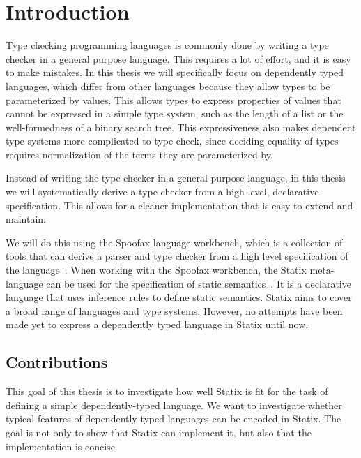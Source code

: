 \chapter{Introduction}

Type checking programming languages is commonly done by writing a type checker in a general purpose language. This requires a lot of effort, and it is easy to make mistakes. In this thesis we will specifically focus on dependently typed languages, which differ from other languages because they allow types to be parameterized by values. This allows types to express properties of values that cannot be expressed in a simple type system, such as the length of a list or the well-formedness of a binary search tree. This expressiveness also makes dependent type systems more complicated to type check, since deciding equality of types requires normalization of the terms they are parameterized by. 

Instead of writing the type checker in a general purpose language, in this thesis we will systematically derive a type checker from a high-level, declarative specification. This allows for a cleaner implementation that is easy to extend and maintain.

We will do this using the Spoofax language workbench, which is a collection of tools that can derive a parser and type checker from a high level specification of the language~\cite{spoofax}. When working with the Spoofax workbench, the Statix meta-language can be used for the specification of static semantics~\cite{scopes_as_types}. It is a declarative language that uses inference rules to define static semantics. Statix aims to cover a broad range of languages and type systems. However, no attempts have been made yet to express a dependently typed language in Statix until now. 

\section*{Contributions}
This goal of this thesis is to investigate how well Statix is fit for the task of defining a simple dependently-typed language. We want to investigate whether typical features of dependently typed languages can be encoded in Statix. The goal is not only to show that Statix can implement it, but also that the implementation is concise.

